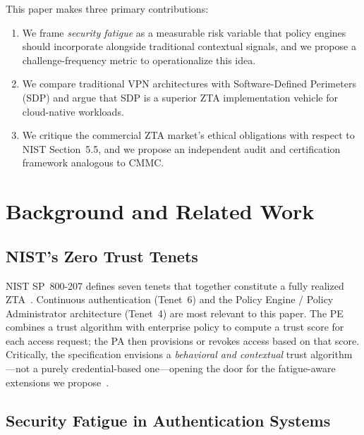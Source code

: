 \documentclass[sigconf,nonacm]{acmart}
\begin{document}
This paper makes three primary contributions:
\begin{enumerate}
\sloppy
  \item We frame \emph{security fatigue} as a measurable risk variable that
        policy engines should incorporate alongside traditional contextual signals,
        and we propose a challenge-frequency metric to operationalize this idea.

  \item We compare traditional VPN architectures with Software-Defined Perimeters
        (SDP) and argue that SDP is a superior ZTA implementation vehicle for
        cloud-native workloads.

  \item We critique the commercial ZTA market's ethical obligations with respect
        to NIST Section~5.5, and we propose an independent audit and certification
        framework analogous to CMMC.
\end{enumerate}

\section{Background and Related Work}
\label{sec:background}

\subsection{NIST's Zero Trust Tenets}

NIST SP~800-207 defines seven tenets that together constitute a fully realized
ZTA~\cite{nist800207}. Continuous authentication (Tenet~6) and the Policy
Engine / Policy Administrator architecture (Tenet~4) are most relevant to this
paper. The PE combines a trust algorithm with enterprise policy to compute a
trust score for each access request; the PA then provisions or revokes access
based on that score. Critically, the specification envisions a \emph{behavioral
and contextual} trust algorithm---not a purely credential-based one---opening
the door for the fatigue-aware extensions we propose~\cite{nist800207,souppaya_zt_guide2023}.

\subsection{Security Fatigue in Authentication Systems}
\end{document}
